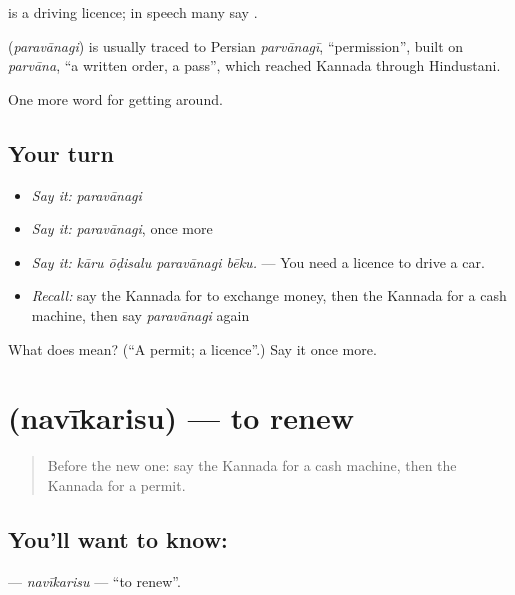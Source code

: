   is a driving licence; in speech many say .

\begin{cousinweb}
\textbf{} (\emph{paravānagi}) is usually traced to Persian \emph{parvānagī}, \textquotedblleft{}permission\textquotedblright{}, built on \emph{parvāna}, \textquotedblleft{}a written order, a pass\textquotedblright{}, which reached Kannada through Hindustani.
\end{cousinweb}

\begin{grammarlens}[title={What you've built}]
One more word for getting around.
\end{grammarlens}

\subsection*{Your turn}
\begin{itemize}
\raggedright
  \item \emph{Say it:} \emph{paravānagi}
  \item \emph{Say it:} \emph{paravānagi}, once more
  \item \emph{Say it:} \emph{kāru ōḍisalu paravānagi bēku.} — You need a licence to drive a car.
  \item \emph{Recall:} say the Kannada for to exchange money, then the Kannada for a cash machine, then say \emph{paravānagi} again
\end{itemize}

\begin{tcolorbox}[breakable,colback=teal!4,colframe=teal!35!black,title={Before you move on}]
What does  mean? (\textquotedblleft{}A permit; a licence\textquotedblright{}.) Say it once more.
\end{tcolorbox}
\section[\texorpdfstring{\kn{ನವೀಕರಿಸು} (navīkarisu)}{ನವೀಕರಿಸು (navīkarisu)}]{ (navīkarisu) — to renew}

\label{lesson:KA-C440-navikarisu}



\begin{quote}
Before the new one: say the Kannada for a cash machine, then the Kannada for a permit.
\end{quote}

\subsection*{You'll want to know: }
\textbf{} — \emph{navīkarisu} — \textquotedblleft{}to renew\textquotedblright{}.

